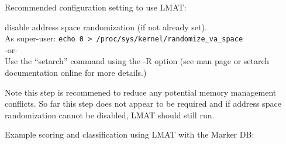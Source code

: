\documentclass[11pt]{article}
\begin{document}
\noindent Recommended configuration setting to use LMAT: 

 disable address space randomization (if not already set).\\
   As super-user: \texttt{echo 0 > /proc/sys/kernel/randomize\_va\_space}\\
-or-\\
 Use the ``setarch'' command using the -R option (see man page or setarch documentation online for more details.)

Note this step is recommened to reduce any potential memory management conflicts. 
So far this step does not appear to be required and if address space randomization cannot be disabled, LMAT should 
still run.   

   
Example scoring and classification using LMAT with the Marker DB:
\end{document}
